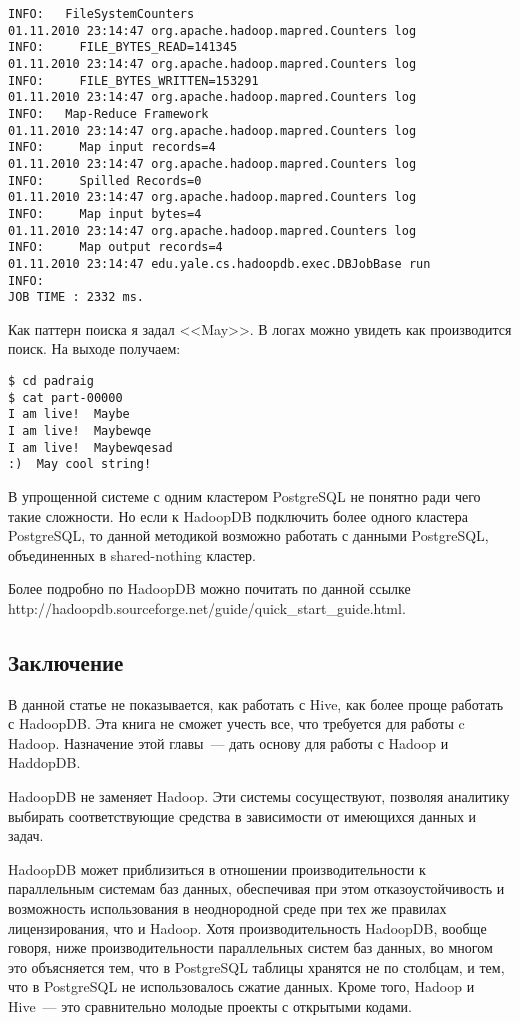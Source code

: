 \begin{lstlisting}[label=lst:haddop27:2,caption=Тестирование]
INFO:   FileSystemCounters
01.11.2010 23:14:47 org.apache.hadoop.mapred.Counters log
INFO:     FILE_BYTES_READ=141345
01.11.2010 23:14:47 org.apache.hadoop.mapred.Counters log
INFO:     FILE_BYTES_WRITTEN=153291
01.11.2010 23:14:47 org.apache.hadoop.mapred.Counters log
INFO:   Map-Reduce Framework
01.11.2010 23:14:47 org.apache.hadoop.mapred.Counters log
INFO:     Map input records=4
01.11.2010 23:14:47 org.apache.hadoop.mapred.Counters log
INFO:     Spilled Records=0
01.11.2010 23:14:47 org.apache.hadoop.mapred.Counters log
INFO:     Map input bytes=4
01.11.2010 23:14:47 org.apache.hadoop.mapred.Counters log
INFO:     Map output records=4
01.11.2010 23:14:47 edu.yale.cs.hadoopdb.exec.DBJobBase run
INFO: 
JOB TIME : 2332 ms.
\end{lstlisting}

Как паттерн поиска я задал <<May>>. В логах можно увидеть как производится поиск. На выходе получаем:
\begin{lstlisting}[label=lst:haddop27:3,caption=Тестирование]
$ cd padraig
$ cat part-00000
I am live!	Maybe
I am live!	Maybewqe
I am live!	Maybewqesad
:)	May cool string!
\end{lstlisting}

В упрощенной системе с одним кластером PostgreSQL не понятно ради чего такие сложности. 
Но если к HadoopDB подключить более одного кластера PostgreSQL, 
то данной методикой возможно работать с данными PostgreSQL, объединенных в shared-nothing кластер.

Более подробно по HadoopDB можно почитать по данной ссылке \\http://hadoopdb.sourceforge.net/guide/quick\_start\_guide.html.


\subsection{Заключение}
В данной статье не показывается, как работать с Hive, как более проще работать с HadoopDB. Эта книга не сможет учесть все, 
что требуется для работы c Hadoop. Назначение этой главы~--- дать основу для работы с Hadoop и HaddopDB.

HadoopDB не заменяет Hadoop. Эти системы сосуществуют, позволяя аналитику выбирать соответствующие средства в зависимости 
от имеющихся данных и задач.

HadoopDB может приблизиться в отношении производительности к параллельным системам 
баз данных, обеспечивая при этом отказоустойчивость и возможность использования в неоднородной среде при тех же правилах 
лицензирования, что и Hadoop. Хотя производительность HadoopDB, вообще говоря, ниже производительности параллельных систем 
баз данных, во многом это объясняется тем, что в PostgreSQL таблицы хранятся не по столбцам, и тем, что в PostgreSQL 
не использовалось сжатие данных. Кроме того, Hadoop и Hive~--- это сравнительно молодые проекты с открытыми кодами. 


